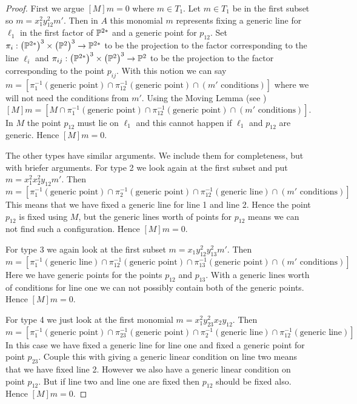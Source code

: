\documentclass[12pt]{article}
\theoremstyle{plain}
\theoremstyle{definition}
\renewcommand{\P}{\ensuremath \mathbb{P}}
\begin{document}
\begin{proof}
First we argue $[M]m=0$ where $m\in T_1$. Let $m\in T_1$ be in the first subset so $m=x_1^2y_{12}^2m'$. Then in $A$ this monomial $m$ represents fixing a generic line for $\ell_1$ in the first factor of $\P^{2*}$ and a generic point for $p_{12}$. Set $\pi_i : \left( \P^{2*}\right)^3 \times \left( \P^2 \right)^3\to \P^{2*}$ to be the projection to the factor corresponding to the line $\ell_i$ and $\pi_{ij} : \left( \P^{2*}\right)^3 \times \left( \P^2 \right)^3\to \P^{2}$ to be the projection to the factor corresponding to the point $p_{ij}$. With this notion we can say $m=[\pi_{1}^{-1}(\text{generic point}) \cap \pi_{12}^{-1}(\text{generic point})\cap (m' \text{ conditions})]$ where we will not need the conditions from $m'$. Using the Moving Lemma (see \cite[Theorem 5.4]{EH}) $$[M]m=[M\cap \pi_{1}^{-1}(\text{generic point}) \cap \pi_{12}^{-1}(\text{generic point})\cap (m' \text{ conditions})] .$$ In $M$ the point $p_{12}$ must lie on $\ell_1$ and this cannot happen if $\ell_1$ and $p_{12}$ are generic. Hence $[M]m=0.$

The other types have similar arguments. We include them for completeness, but with briefer arguments. For type 2 we look again at the first subset and put $m=x_1^2x_2^2y_{12}m'$. Then $$m=[\pi_{1}^{-1}(\text{generic point})\cap \pi_{2}^{-1}(\text{generic point}) \cap \pi_{12}^{-1}(\text{generic line})\cap (m' \text{ conditions})].$$ This means that we have fixed a generic line for line 1 and line 2. Hence the point $p_{12}$ is fixed using $M$, but the generic lines worth of points for $p_{12}$ means we can not find such a configuration. Hence $[M]m=0$.

For type 3 we again look at the first subset $m=x_1y_{12}^2y_{13}^2m'$. Then $$m=[\pi_{1}^{-1}(\text{generic line})\cap \pi_{12}^{-1}(\text{generic point})\cap \pi_{13}^{-1}(\text{generic point})\cap (m' \text{ conditions})] .$$ Here we have generic points for the points $p_{12}$ and $p_{13}$. With a generic lines worth of conditions for line one we can not possibly contain both of the generic points. Hence $[M]m=0$.

For type 4 we just look at the first monomial $m= x_1^2y_{23}^2x_2y_{12}$. Then $$m=[\pi_{1}^{-1}(\text{generic point})\cap \pi_{23}^{-1}(\text{generic point})\cap \pi_{2}^{-1}(\text{generic line})\cap \pi_{12}^{-1}(\text{generic line})].$$ In this case we have fixed a generic line for line one and fixed a generic point for point $p_{23}$. Couple this with giving a generic linear condition on line two means that we have fixed line 2. However we also have a generic linear condition on point $p_{12}$. But if line two and line one are fixed then $p_{12}$ should be fixed also. Hence $[M]m=0$.


\end{proof}
\end{document}
